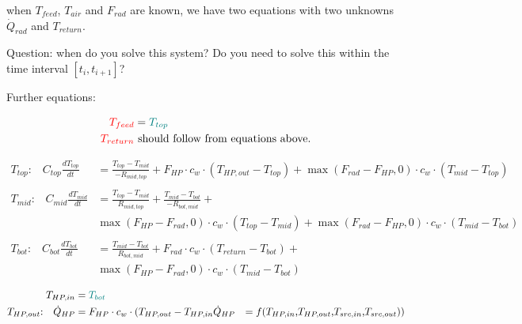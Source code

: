 when $T_{feed}$, $T_{air}$ and $F_{rad}$ are known, we have two equations with two unknowns $\dot{Q}_{rad}$ and $T_{return}$.

{\color{red}Question: when do you solve this system? Do you need to solve this within the time interval $[t_i, t_{i+1}]$?}

Further equations:

\begin{equation}
	\begin{aligned}
        {\color{red}T_{feed}} &= {\color{teal}T_{top}} \\
        {\color{red}T_{return}} & \text{ should follow from equations above.}
    \end{aligned}
\end{equation}

{\color{teal}
\begin{equation}
	\label{eq:buffer}
	\begin{aligned}
	T_{top} \text{:} \quad C_{top}\frac{dT_{top}}{dt} &= \frac{T_{top}-T_{mid}}{-R_{mid, top}} + F_{HP} \cdot c_w \cdot (T_{HP,out} - T_{top}) + \max(F_{rad}-F_{HP}, 0) \cdot c_w \cdot (T_{mid} - T_{top})
    \\ \\
    T_{mid} \text{:} \quad C_{mid}\frac{dT_{mid}}{dt} &= \frac{T_{top}-T_{mid}}{R_{mid, top}} + \frac{T_{mid}-T_{bot}}{-R_{bot, mid}} + \\
    & \max(F_{HP}-F_{rad}, 0) \cdot c_w \cdot (T_{top} - T_{mid}) + \max(F_{rad}-F_{HP}, 0) \cdot c_w \cdot (T_{mid} - T_{bot}) 
    \\ \\
    T_{bot} \text{:} \quad C_{bot}\frac{dT_{bot}}{dt} &= \frac{T_{mid}-T_{bot}}{R_{bot, mid}} + F_{rad} \cdot c_w \cdot (T_{return} - T_{bot}) + \\
    & \max(F_{HP}-F_{rad}, 0) \cdot c_w \cdot (T_{mid} - T_{bot})
	\end{aligned}
\end{equation}
}

\begin{equation}
	\begin{aligned}
		T_{HP,in} &= {\color{teal}T_{bot}} \\
		T_{HP,out} \text{:} \quad \dot{Q}_{HP} &= F_{HP} \cdot c_w \cdot (T_{HP,out} - T_{HP,in}
		\dot{Q}_{HP} &= f(T_{HP,in}\text{,} T_{HP,out}\text{,} T_{src,in}\text{,} T_{src,out}))
	\end{aligned}
\end{equation}

